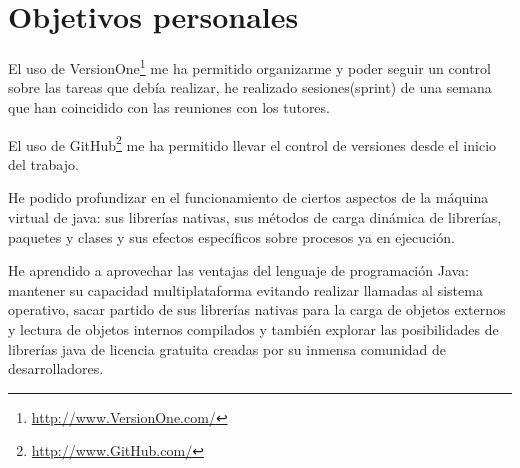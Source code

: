 \section{Objetivos personales}


El uso de VersionOne\footnote{\url{http://www.VersionOne.com/}} me ha permitido organizarme y poder seguir un control sobre las tareas que debía realizar, he realizado sesiones(sprint) de una semana que han coincidido con las reuniones con los tutores.

El uso de GitHub\footnote{\url{http://www.GitHub.com/}} me ha permitido llevar el control de versiones desde el inicio del trabajo.

He podido profundizar en el funcionamiento de ciertos aspectos de la máquina virtual de java: sus librerías nativas, sus métodos de carga dinámica de librerías, paquetes y clases y sus efectos específicos sobre procesos ya en ejecución.

He aprendido a aprovechar las ventajas del lenguaje de programación Java: mantener su capacidad multiplataforma evitando realizar llamadas al sistema operativo, sacar partido de sus librerías nativas para la carga de objetos externos y lectura de objetos internos compilados y también explorar las posibilidades de librerías java de licencia gratuita creadas por su inmensa comunidad de desarrolladores.


